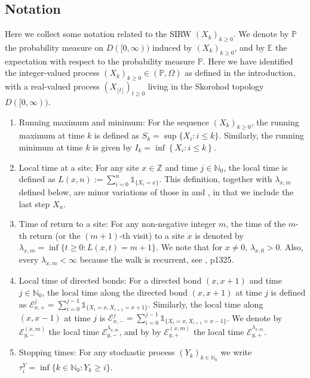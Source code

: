 \documentclass[EJP]{ejpecp} %
\begin{document}
\subsection{Notation}


	Here we collect some notation related to the SIRW $(X_k)_{k \ge 0}$.
	We denote by $\mathbb{P}$ the probability measure on $D([0,\infty))$ induced by $(X_k)_{k\geq 0}$, and by $\mathbb{E}$ the expectation with respect to the probability measure $\mathbb{P}$. Here we have identified the integer-valued process $(X_k)_{k \ge 0} \in (\mathbb{P}, \Omega)$ as defined in the introduction, with a real-valued process $(X_{\lfloor t \rfloor})_{t \ge 0}$ living in the Skorohod topology $D([0,\infty))$. 
\begin{enumerate}
	\item Running maximum and minimum: For the sequence $(X_k)_{k \ge 0}$, the running maximum at time $k$ is defined as $S_k = \sup\{X_i : i \le k\}$. Similarly, the running minimum at time $k$ is given by $I_k = \inf \left\{X_i: i \le k\right\}$.
	\item
	Local time at a site: For any site $x \in \mathbb{Z}$ and time $j \in \mathbb{N}_0$, the local time is defined as $L(x,n):= \sum_{i=0}^n \mathbb{1}_{\{X_i=x\}}$. 
	This definition, together with $\lambda_{x, m}$ defined below, are minor variations of those in \cite{KMP23} and \cite{KP16}, in that we include the last step $X_n$.
	\item
	Time of return to a site: For any non-negative integer $m$, the time of the $m$-th return (or the $(m+1)$-th visit) to a site $x$ is denoted by $\lambda_{x,m} = \inf\{t \geq 0: L(x,t) = m+1\}$. 
	We note that for $x\neq 0$, $\lambda_{x,0} > 0$. Also, every $\lambda_{x,m}<\infty$ because the walk is recurrent, see \cite{T96}, p1325.
	\item
	Local time of directed bonds: For a directed bond $(x,x+1)$ and time $j \in \mathbb{N}_0$, the local time along the directed bond $(x, x+1)$ at time $j$ is defined as $\mathcal{E}^j_{x,+} = \sum_{i=0}^{j-1} \mathbb{1}_{\{X_i=x, X_{i+1} =x+1\}}$. 
	Similarly, the local time along $(x,x-1)$ at time $j$ is $\mathcal{E}^j_{x,-} = \sum_{i=0}^{j-1} \mathbb{1}_{\{X_i=x, X_{i+1} =x-1\}}$.
	We denote by $\mathcal{E}^{(x,m)}_{y, -}$ the local time $\mathcal{E}^{\lambda_{x,m}}_{y,-}$, and by by $\mathcal{E}^{(x,m)}_{y, +}$ the local time $\mathcal{E}^{\lambda_{x,m}}_{y,+}$.
	\item
	Stopping times: For any stochastic process $(Y_k)_{k \in \mathbb{N}_0}$ we write $\tau^Y_{i} = \inf \{k \in  \mathbb{N}_0: Y_k \ge  i\}$.
\end{enumerate}
\end{document}
